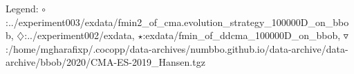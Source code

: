 Legend: {\color{NavyBlue}$\circ$}:../experiment003/exdata/fmin2\_of\_cma.evolution\_strategy\_100000D\_on\_bbob, {\color{Magenta}$\diamondsuit$}:../experiment002/exdata, {\color{Orange}$\star$}:exdata/fmin\_of\_ddcma\_100000D\_on\_bbob, {\color{CornflowerBlue}$\triangledown$}:/home/mgharafixp/.cocopp/data-archives/numbbo.github.io/data-archive/data-archive/bbob/2020/CMA-ES-2019\_Hansen.tgz